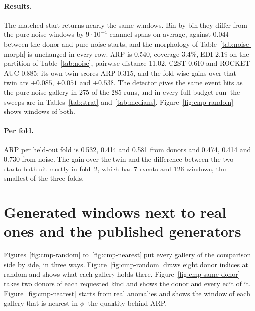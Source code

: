 \documentclass[11pt,a4paper]{article}
\newcommand{\phivec}{\phi}                 %
\begin{document}
\paragraph{Results.}
The matched start returns nearly the same windows. Bin by bin they differ
from the pure-noise windows by $9 \cdot 10^{-4}$ channel spans on average,
against 0.044 between the donor and pure-noise starts, and the morphology of
Table~\ref{tab:noise-morph} is unchanged in every row. ARP is 0.540, coverage
3.4\%, EDI 2.19 on the partition of Table~\ref{tab:noise}, pairwise distance
11.02, C2ST 0.610 and ROCKET AUC 0.885; its own twin scores ARP 0.315, and the
fold-wise gains over that twin are $+0.085$, $+0.051$ and $+0.538$. The
detector gives the same event hits as the pure-noise gallery in 275 of the 285
runs, and in every full-budget run; the sweeps are in
Tables~\ref{tab:strat} and~\ref{tab:medians}. Figure~\ref{fig:cmp-random}
shows windows of both.

\paragraph{Per fold.}
ARP per held-out fold is 0.532, 0.414 and 0.581 from donors and 0.474, 0.414
and 0.730 from noise. The gain over the twin and the difference between the
two starts both sit mostly in fold~2, which has 7 events and 126 windows, the
smallest of the three folds.

\section{Generated windows next to real ones and the published generators}
\label{app:gallery}

Figures~\ref{fig:cmp-random} to~\ref{fig:cmp-nearest} put every gallery of the
comparison side by side, in three ways. Figure~\ref{fig:cmp-random} draws
eight donor indices at random and shows what each gallery holds there.
Figure~\ref{fig:cmp-same-donor} takes two donors of each requested kind and
shows the donor and every edit of it. Figure~\ref{fig:cmp-nearest} starts
from real anomalies and shows the window of each gallery that is nearest in
$\phivec$, the quantity behind ARP.
\end{document}
